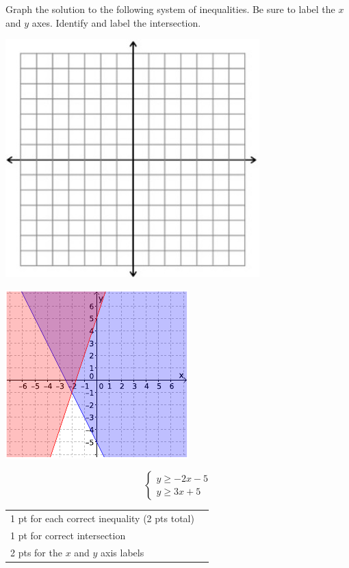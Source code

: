 {
	Graph the solution to the following system of inequalities. Be sure to label the $x$ and $y$ axes. Identify and label the intersection. \begin{onlyproblem}\begin{center}\includegraphics{fig-graphpaper.png}\end{center}\end{onlyproblem} \begin{onlysolution}\begin{center}\includegraphics{fig095-12-c-answer}\end{center}\end{onlysolution}
	$$\begin{cases}y\geq -2x-5\\ y\geq 3x+5 \end{cases}$$
}
{
	\begin{tabular}{l r}
	1 pt for each correct inequality (2 pts total)\\
	1 pt for correct intersection\\
	2 pts for the $x$ and $y$ axis labels\\
	\end{tabular}
}

